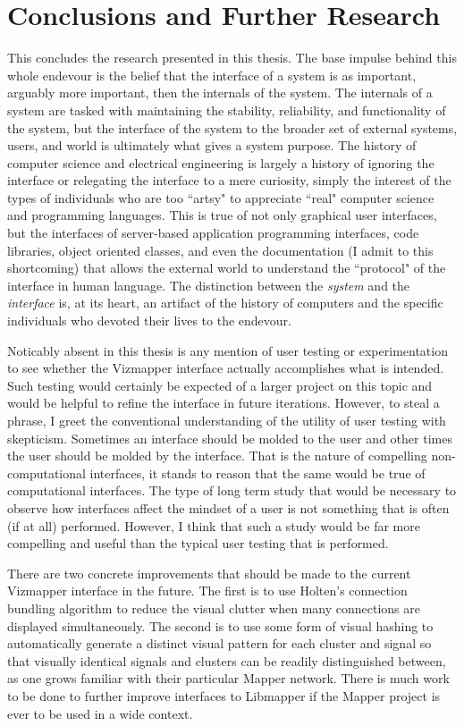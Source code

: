 \resetdatestamp

\chapter{Conclusions and Further Research}

This concludes the research presented in this thesis. The base impulse behind this whole endevour is the belief that the interface of a system is as important, arguably more important, then the internals of the system. The internals of a system are tasked with maintaining the stability, reliability, and functionality of the system, but the interface of the system to the broader set of external systems, users, and world is ultimately what gives a system purpose. The history of computer science and electrical engineering is largely a history of ignoring the interface or relegating the interface to a mere curiosity, simply the interest of the types of individuals who are too ``artsy" to appreciate ``real" computer science and programming languages. This is true of not only graphical user interfaces, but the interfaces of server-based application programming interfaces, code libraries, object oriented classes, and even the documentation (I admit to this shortcoming) that allows the external world to understand the ``protocol" of the interface in human language. The distinction between the \emph{system} and the \emph{interface} is, at its heart, an artifact of the history of computers and the specific individuals who devoted their lives to the endevour.

Noticably absent in this thesis is any mention of user testing or experimentation to see whether the Vizmapper interface actually accomplishes what is intended. Such testing would certainly be expected of a larger project on this topic and would be helpful to refine the interface in future iterations. However, to steal a phrase, I greet the conventional understanding of the utility of user testing with skepticism. Sometimes an interface should be molded to the user and other times the user should be molded by the interface. That is the nature of compelling non-computational interfaces, it stands to reason that the same would be true of computational interfaces. The type of long term study that would be necessary to observe how interfaces affect the mindset of a user is not something that is often (if at all) performed. However, I think that such a study would be far more compelling and useful than the typical user testing that is performed.

There are two concrete improvements that should be made to the current Vizmapper interface in the future. The first is to use Holten's connection bundling algorithm \cite{edgebundles2006} to reduce the visual clutter when many connections are displayed simultaneously. The second is to use some form of visual hashing to automatically generate a distinct visual pattern for each cluster and signal so that visually identical signals and clusters can be readily distinguished between, as one grows familiar with their particular Mapper network. There is much work to be done to further improve interfaces to Libmapper if the Mapper project is ever to be used in a wide context.
